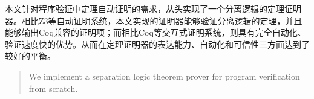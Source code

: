 \begin{cnabstract}
本文针对程序验证中定理自动证明的需求，从头实现了一个分离逻辑的定理证明器。相比Z3等自动证明系统，本文实现的证明器能够验证分离逻辑的定理，并且能够输出Coq兼容的证明项；而相比Coq等交互式证明系统，则具有完全自动化、验证速度快的优势。从而在定理证明器的表达能力、自动化和可信性三方面达到了较好的平衡。

\end{cnabstract}

\begin{abstract}
We implement a separation logic theorem prover for program verification from scratch.
\end{abstract}
